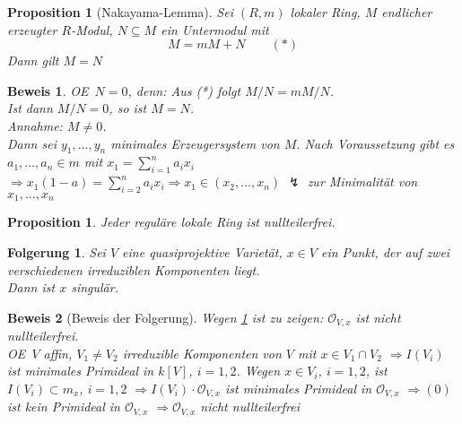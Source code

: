 \documentclass[a4paper,12pt]{report}
\theoremstyle{break}
\newtheorem{Prop}[Def]{Proposition}
\newtheorem{Folg}[Def]{Folgerung}
\theoremstyle{nonumberbreak}
\newtheorem{Bew}{Beweis}
\theoremstyle{nonumberplain}
\newcommand{\calO}{\mathcal{O}}
\renewcommand{\OE}{O\!\!E~}
\begin{document}
\begin{Prop}[Nakayama-Lemma]\label{19.5}
Sei $(R,m)$ lokaler Ring, $M$ endlicher erzeugter $R$-Modul, $N\subseteq M$ ein Untermodul mit
	\[M=mM+N \qquad (*)\]
Dann gilt $M=N$
\end{Prop}

\begin{Bew}
\OE $N=0$, denn: Aus (*) folgt $M/N=mM/N$.\\
Ist dann $M/N=0$, so ist $M=N$.\\
\emph{Annahme:} $M\ne0$.\\
Dann sei $y_1,\ldots ,y_n$ minimales Erzeugersystem von $M$. Nach Voraussetzung gibt es $a_1,\ldots ,a_n\in m$ mit $x_1=\sum\limits_{i=1}^na_ix_i$\\
$\Rightarrow x_1(1-a)=\sum\limits_{i=2}^na_ix_i \Rightarrow x_1\in (x_2,\ldots ,x_n)$ $\lightning$ zur Minimalit\"at von $x_1,\ldots ,x_n$
\end{Bew}

\begin{Prop}\label{19.6}
Jeder regul\"are lokale Ring ist nullteilerfrei.
\end{Prop}

\begin{Folg}
Sei $V$ eine quasiprojektive Variet\"at, $x\in V$ ein Punkt, der auf zwei verschiedenen irreduziblen Komponenten liegt.\\
Dann ist $x$ singul\"ar.
\end{Folg}

\begin{Bew}[Beweis der Folgerung]
Wegen \ref{19.6} ist zu zeigen: $\calO_{V,x}$ ist nicht nullteilerfrei.\\
\OE $V$ affin, $V_1\ne V_2$ irreduzible Komponenten von $V$ mit $x\in V_1\cap V_2$ $\Rightarrow I(V_i)$ ist minimales Primideal in $k[V]$, $i=1,2$. Wegen $x\in V_i$, $i=1,2$, ist $I(V_i)\subset m_x$, $i=1,2$ $\Rightarrow I(V_i)\cdot \calO_{V,x}$ ist minimales Primideal in $\calO_{V,x}$ $\Rightarrow (0)$ ist kein Primideal in $\calO_{V,x}$ $\Rightarrow \calO_{V,x}$ nicht nullteilerfrei
\end{Bew}
\end{document}
